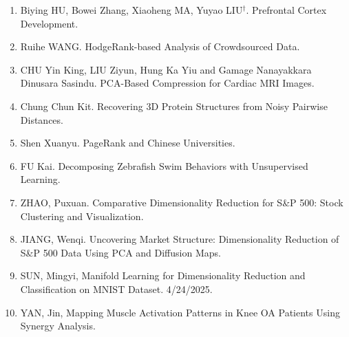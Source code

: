 \documentclass[11pt]{article}
\begin{document}
\begin{enumerate}
\item Biying HU, Bowei Zhang, Xiaoheng MA, Yuyao LIU$^\dagger$. Prefrontal Cortex Development. \\
\item Ruihe WANG. HodgeRank-based Analysis of Crowdsourced Data. \\
\item CHU Yin King, LIU Ziyun, Hung Ka Yiu and Gamage Nanayakkara Dinusara Sasindu. PCA-Based Compression for Cardiac MRI Images. \\
\item Chung Chun Kit. Recovering 3D Protein Structures from Noisy Pairwise Distances. \\
\item Shen Xuanyu. PageRank and Chinese Universities. \\
\item FU Kai. Decomposing Zebrafish Swim Behaviors with Unsupervised Learning. \\
\item ZHAO, Puxuan. Comparative Dimensionality Reduction for S\&P 500: Stock Clustering and Visualization. \\
\item JIANG, Wenqi. Uncovering Market Structure: Dimensionality Reduction of S\&P 500 Data Using PCA and Diffusion Maps. \\
\item SUN, Mingyi, Manifold Learning for Dimensionality Reduction and Classification on MNIST Dataset. 4/24/2025. \\
\item YAN, Jin, Mapping Muscle Activation Patterns in Knee OA Patients Using Synergy Analysis. 
\end{enumerate}

%
%
%
\end{document}
